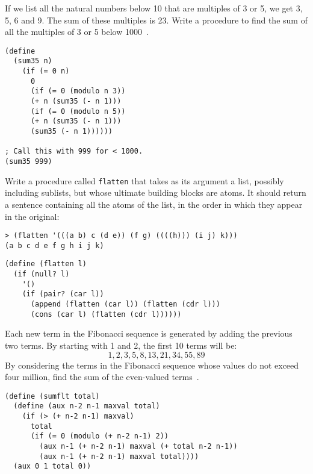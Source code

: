 \documentclass[a4paper, 12pt]{exam}
\begin{document}
\begin{questions}
\question
If we list all the natural numbers below 10 that are multiples of 3 or 5, we get 3, 5, 6 and 9.
The sum of these multiples is 23.
Write a procedure to find the sum of all the multiples of 3 or 5 below 1000~\cite{projecteuler}.

\begin{solution}
  \begin{verbatim}
(define 
  (sum35 n)
    (if (= 0 n)
      0
      (if (= 0 (modulo n 3))
      (+ n (sum35 (- n 1)))
      (if (= 0 (modulo n 5))
      (+ n (sum35 (- n 1)))
      (sum35 (- n 1))))))

; Call this with 999 for < 1000.
(sum35 999)
  \end{verbatim}
\end{solution}

\question
Write a procedure called \texttt{flatten} that takes as its argument a list, possibly including sublists, but whose ultimate building blocks are atoms.
It should return a sentence containing all the atoms of the list, in the order in which they appear in the original:
\begin{verbatim}
> (flatten '(((a b) c (d e)) (f g) ((((h))) (i j) k)))
(a b c d e f g h i j k)
\end{verbatim}

\begin{solution}
  \begin{verbatim}
(define (flatten l)
  (if (null? l)
    '()
    (if (pair? (car l))
      (append (flatten (car l)) (flatten (cdr l)))
      (cons (car l) (flatten (cdr l))))))
  \end{verbatim}
\end{solution}

\question
Each new term in the Fibonacci sequence is generated by adding the previous two terms.
By starting with 1 and 2, the first 10 terms will be:
\[ 1, 2, 3, 5, 8, 13, 21, 34, 55, 89 \]
By considering the terms in the Fibonacci sequence whose values do not exceed four million, find the sum of the even-valued terms~\cite{projecteuler}.

\begin{solution}
  \begin{verbatim}
(define (sumflt total)
  (define (aux n-2 n-1 maxval total)
    (if (> (+ n-2 n-1) maxval)
      total
      (if (= 0 (modulo (+ n-2 n-1) 2))
        (aux n-1 (+ n-2 n-1) maxval (+ total n-2 n-1))
        (aux n-1 (+ n-2 n-1) maxval total))))
  (aux 0 1 total 0))
  \end{verbatim}
\end{solution}


\end{questions}
\end{document}
